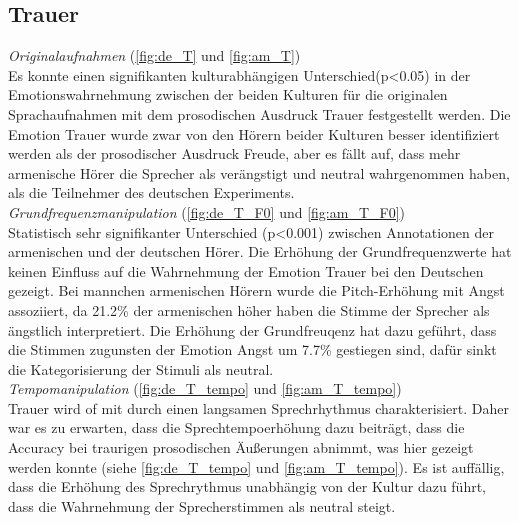 \documentclass[11pt,a4paper,headsepline,twoside,toc=bibliography]{scrreprt}
\begin{document}
\subsection{Trauer}
\label{sec:Trauer}

\emph{Originalaufnahmen} (\autoref{fig:de_T} und \ref{fig:am_T}) \\
Es konnte einen signifikanten kulturabhängigen Unterschied(p<0.05) in der Emotionswahrnehmung zwischen der beiden Kulturen für die originalen Sprachaufnahmen mit dem prosodischen Ausdruck Trauer festgestellt werden.
Die Emotion Trauer wurde zwar von den Hörern beider Kulturen besser identifiziert werden als der prosodischer Ausdruck Freude, aber es fällt auf, dass mehr armenische Hörer die Sprecher als verängstigt und neutral wahrgenommen haben, als die Teilnehmer des deutschen Experiments.\\

\noindent
\emph{Grundfrequenzmanipulation} (\autoref{fig:de_T_F0} und \ref{fig:am_T_F0}) \\
Statistisch sehr signifikanter Unterschied (p<0.001) zwischen Annotationen der armenischen und der deutschen Hörer.
Die Erhöhung der Grundfrequenzwerte hat keinen Einfluss auf die Wahrnehmung der Emotion Trauer bei den Deutschen gezeigt. Bei mannchen armenischen Hörern wurde die Pitch-Erhöhung mit Angst assoziiert, da 
21.2\% der armenischen höher haben die Stimme der Sprecher als ängstlich interpretiert. Die Erhöhung der Grundfreuqenz hat dazu geführt, dass die Stimmen zugunsten der Emotion Angst um 7.7\% gestiegen sind, dafür sinkt  die Kategorisierung der Stimuli als neutral.\\

\noindent
\emph{Tempomanipulation} (\autoref{fig:de_T_tempo} und \ref{fig:am_T_tempo}) \\

Trauer wird of mit durch einen langsamen Sprechrhythmus charakterisiert. Daher war es zu erwarten, dass die Sprechtempoerhöhung dazu beiträgt, dass die Accuracy bei traurigen prosodischen Äußerungen abnimmt, was hier gezeigt werden konnte (siehe \ref{fig:de_T_tempo} und \ref{fig:am_T_tempo}). Es ist auffällig, dass die Erhöhung des Sprechrythmus unabhängig von der Kultur dazu führt, dass die Wahrnehmung der Sprecherstimmen als neutral steigt. 
\end{document}
